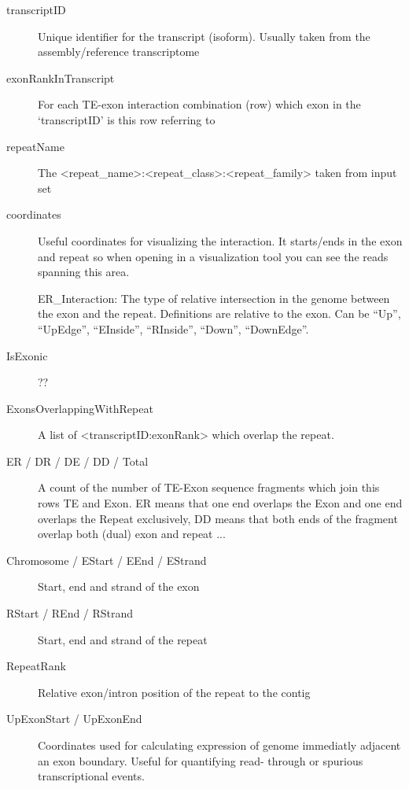 \documentclass[11pt]{scrartcl}
\newcommand{\arrows}[1]{\textless #1\textgreater}
\begin{document}
\begin{description}
\item[transcriptID] Unique identifier for the transcript (isoform). Usually taken
  from the assembly/reference transcriptome

\item[exonRankInTranscript] For each TE-exon interaction combination (row) which exon
  in the `transcriptID' is this row referring to

\item[repeatName] The \arrows{repeat\_name}:\arrows{repeat\_class}:\arrows{repeat\_family} taken from input
  set

\item[coordinates] Useful coordinates for visualizing the interaction. It starts/ends
  in the exon and repeat so when opening in a visualization tool you can see
  the reads spanning this area.

ER\_Interaction: The type of relative intersection in the genome between the exon
  and the repeat. Definitions are relative to the exon. Can be ``Up'', ``UpEdge'', ``EInside'', ``RInside'', ``Down'', ``DownEdge''.

\item[IsExonic] ??

\item[ExonsOverlappingWithRepeat] A list of \arrows{transcriptID:exonRank} which overlap
  the repeat.

\item[ER / DR / DE / DD / Total] A count of the number of TE-Exon sequence fragments
  which join this rows TE and Exon. ER means that one end overlaps the Exon
  and one end overlaps the Repeat exclusively, DD means that both ends of the
  fragment overlap both (dual) exon and repeat ...

\item[Chromosome / EStart / EEnd / EStrand] Start, end and strand of the exon

\item[RStart / REnd / RStrand] Start, end and strand of the repeat

\item[RepeatRank] Relative exon/intron position of the repeat to the contig

\item[UpExonStart / UpExonEnd] Coordinates used for calculating expression of
  genome immediatly adjacent an exon boundary. Useful for quantifying read-
  through or spurious transcriptional events.


\end{description}
\end{document}
